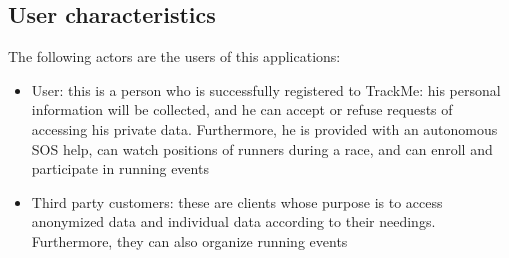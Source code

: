 \subsection{User characteristics}
The following actors are the users of this applications:

\begin{itemize}
\item User: this is a person who is successfully registered to TrackMe: his personal information will be collected, and he can accept or refuse requests of accessing his private data. 
Furthermore, he is provided with an autonomous SOS help, can watch positions of runners during a race, and can enroll and participate in running events  
\item Third party customers: these are clients whose purpose is to access anonymized data and individual data according to their needings.
Furthermore, they can also organize running events
\end{itemize}